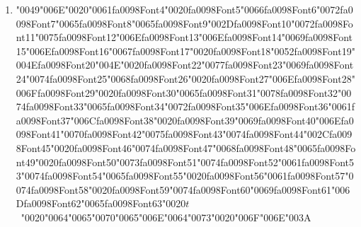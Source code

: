 \documentclass[12pt]{article}
\begin{document}
\begin{enumerate}[label=Q\arabic*.]
\item {\char"0049}{\char"006E}{\char"0020}{\char"0061}{\csname fa0098Font4\endcsname\char"0020}{\csname fa0098Font5\endcsname\char"0066}{\csname fa0098Font6\endcsname\char"0072}{\csname fa0098Font7\endcsname\char"0065}{\csname fa0098Font8\endcsname\char"0065}{\csname fa0098Font9\endcsname\char"002D}{\csname fa0098Font10\endcsname\char"0072}{\csname fa0098Font11\endcsname\char"0075}{\csname fa0098Font12\endcsname\char"006E}{\csname fa0098Font13\endcsname\char"006E}{\csname fa0098Font14\endcsname\char"0069}{\csname fa0098Font15\endcsname\char"006E}{\csname fa0098Font16\endcsname\char"0067}{\csname fa0098Font17\endcsname\char"0020}{\csname fa0098Font18\endcsname\char"0052}{\csname fa0098Font19\endcsname\char"004E}{\csname fa0098Font20\endcsname\char"004E}{\char"0020}{\csname fa0098Font22\endcsname\char"0077}{\csname fa0098Font23\endcsname\char"0069}{\csname fa0098Font24\endcsname\char"0074}{\csname fa0098Font25\endcsname\char"0068}{\csname fa0098Font26\endcsname\char"0020}{\csname fa0098Font27\endcsname\char"006E}{\csname fa0098Font28\endcsname\char"006F}{\csname fa0098Font29\endcsname\char"0020}{\csname fa0098Font30\endcsname\char"0065}{\csname fa0098Font31\endcsname\char"0078}{\csname fa0098Font32\endcsname\char"0074}{\csname fa0098Font33\endcsname\char"0065}{\csname fa0098Font34\endcsname\char"0072}{\csname fa0098Font35\endcsname\char"006E}{\csname fa0098Font36\endcsname\char"0061}{\csname fa0098Font37\endcsname\char"006C}{\csname fa0098Font38\endcsname\char"0020}{\csname fa0098Font39\endcsname\char"0069}{\csname fa0098Font40\endcsname\char"006E}{\csname fa0098Font41\endcsname\char"0070}{\csname fa0098Font42\endcsname\char"0075}{\csname fa0098Font43\endcsname\char"0074}{\csname fa0098Font44\endcsname\char"002C}{\csname fa0098Font45\endcsname\char"0020}{\csname fa0098Font46\endcsname\char"0074}{\csname fa0098Font47\endcsname\char"0068}{\csname fa0098Font48\endcsname\char"0065}{\csname fa0098Font49\endcsname\char"0020}{\csname fa0098Font50\endcsname\char"0073}{\csname fa0098Font51\endcsname\char"0074}{\csname fa0098Font52\endcsname\char"0061}{\csname fa0098Font53\endcsname\char"0074}{\csname fa0098Font54\endcsname\char"0065}{\csname fa0098Font55\endcsname\char"0020}{\csname fa0098Font56\endcsname\char"0061}{\csname fa0098Font57\endcsname\char"0074}{\csname fa0098Font58\endcsname\char"0020}{\csname fa0098Font59\endcsname\char"0074}{\csname fa0098Font60\endcsname\char"0069}{\csname fa0098Font61\endcsname\char"006D}{\csname fa0098Font62\endcsname\char"0065}{\csname fa0098Font63\endcsname\char"0020}$t$\ {\char"0020}{\char"0064}{\char"0065}{\char"0070}{\char"0065}{\char"006E}{\char"0064}{\char"0073}{\char"0020}{\char"006F}{\char"006E}{\char"003A}

\end{enumerate}
\end{document}
